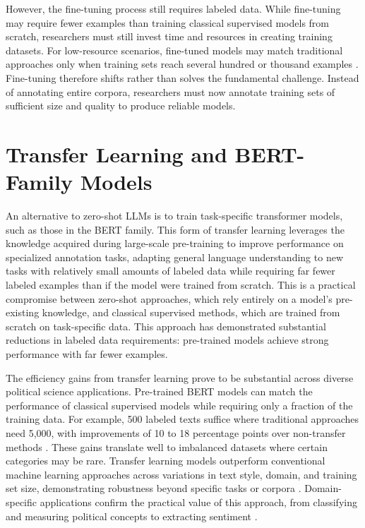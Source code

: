 \documentclass[12pt]{article}
\begin{document}
However, the fine-tuning process still requires labeled data. While fine-tuning may require fewer examples than training classical supervised models from scratch, researchers must still invest time and resources in creating training datasets. For low-resource scenarios, fine-tuned models may match traditional approaches only when training sets reach several hundred or thousand examples \parencite{wang_etal24}. Fine-tuning therefore shifts rather than solves the fundamental challenge. Instead of annotating entire corpora, researchers must now annotate training sets of sufficient size and quality to produce reliable models.

\section{Transfer Learning and BERT-Family Models}

An alternative to zero-shot LLMs is to train task-specific transformer models, such as those in the BERT family. This form of transfer learning leverages the knowledge acquired during large-scale pre-training to improve performance on specialized annotation tasks,  adapting general language understanding to new tasks with relatively small amounts of labeled data while requiring far fewer labeled examples than if the model were trained from scratch. This is a practical compromise between zero-shot approaches, which rely entirely on a model’s pre-existing knowledge, and classical supervised methods, which are trained from scratch on task-specific data. This approach has demonstrated substantial reductions in labeled data requirements: pre-trained models achieve strong performance with far fewer examples\parencite{laurer_etal23, wankmuller24}.

The efficiency gains from transfer learning prove to be substantial across diverse political science applications. Pre-trained BERT models can match the performance of classical supervised models while requiring only a fraction of the training data. For example, 500 labeled texts suffice where traditional approaches need 5,000, with improvements of 10 to 18 percentage points over non-transfer methods \parencite{laurer_etal23}. These gains translate well to imbalanced datasets where certain categories may be rare. Transfer learning models outperform conventional machine learning approaches across variations in text style, domain, and training set size, demonstrating robustness beyond specific tasks or corpora \parencite{wankmuller24}. Domain-specific applications confirm the practical value of this approach, from classifying and measuring political concepts to extracting sentiment \parencite{dreier_etal25, matsuo_fukumoto25, bonikowskiPoliticsUsualMeasuring2022}.
\end{document}
